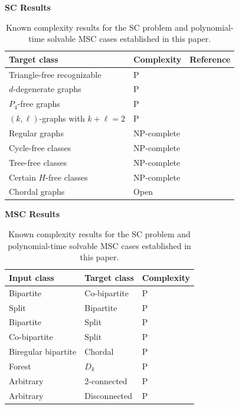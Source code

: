 \documentclass[11pt]{article}
\theoremstyle{definition}
\begin{document}
\begin{table}[ht]
\centering
\small

\begin{minipage}[t]{0.42\textwidth}
\centering
\textbf{SC Results}

\vspace{2mm}

\begin{tabular}{lll}
\toprule
Target class & Complexity & Reference \\
\midrule
Triangle-free recognizable & P & \cite{DBLP:journals/algorithmica/FominGST20} \\
$d$-degenerate graphs & P & \cite{DBLP:journals/algorithmica/FominGST20} \\
$P_4$-free graphs & P & 
\cite{DBLP:journals/algorithmica/FominGST20} \\
$(k,\ell)$-graphs with $k + \ell =2$ & P & 
\cite{DBLP:journals/algorithmica/FominGST20} \\
Regular graphs & NP-complete & \cite{DBLP:journals/algorithmica/FominGST20} \\
Cycle-free classes & NP-complete & \cite{DBLP:journals/ipl/AntonyPS25} \\
Tree-free classes & NP-complete & \cite{antony2024cutting} \\
Certain $H$-free classes & NP-complete & \cite{DBLP:journals/algorithmica/AntonyGPSSS22} \\
Chordal graphs & Open & \cite{DBLP:journals/algorithmica/FominGST20} \\
\bottomrule
\end{tabular}
\end{minipage}
\hfill
\hspace{1cm}
\hfill
\begin{minipage}[t]{0.42\textwidth}
\centering
\textbf{MSC Results}

\vspace{2mm}

\begin{tabular}{lll}
\toprule
Input class & Target class & Complexity \\
\midrule
Bipartite & Co-bipartite & P \\
Split & Bipartite & P \\
Bipartite & Split & P \\
Co-bipartite & Split & P \\
Biregular bipartite & Chordal & P \\
Forest & $D_k$ & P \\
Arbitrary & 2-connected & P \\
Arbitrary & Disconnected & P \\
\bottomrule
\end{tabular}
\end{minipage}

\caption{Known complexity results for the SC problem and polynomial-time solvable MSC cases established in this paper.}
\label{tab:summary-results}
\end{table}
\end{document}
